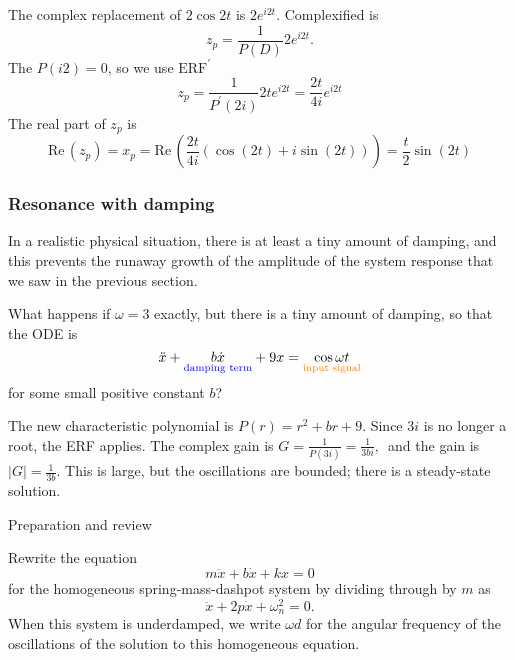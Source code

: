 The complex replacement of $2 \cos 2 t$ is $2 e^{i2t}$.
Complexified is
\begin{equation*}
  z_ p = \frac{1}{P(D)} 2 e^{i2t}. 
\end{equation*}
The $P(i2) = 0$, so we use $\text{ERF}^{\prime}$
\begin{equation*}
  z_ p = \frac{1}{P^{\prime} (2i)} 2t e^{i2t}
  = \frac{2t}{4i}  e^{i2t} 
\end{equation*}
The real part of $z _p$ is
\begin{equation*}
  \mathrm{Re\, } (z _p) = x _p 
  = \mathrm{Re\, } \left(\frac{2t}{4i} \left( \cos (2t) + i \sin (2t)\right) \right)
  = \frac{t}{2} \sin (2t)
\end{equation*}
\clearpage

\subsubsection{Resonance with damping}
In a realistic physical situation, there is at least a tiny amount of damping,
and this prevents the runaway growth of the amplitude of the system response
that we saw in the previous section.\\

\begin{question}
  What happens if $\omega = 3$ exactly, but there is a tiny amount of damping, so that the ODE is
  \begin{equation*}
    \ddot{x} + \underset {{\color{blue}{\text {damping term}}} }{b \dot{x}} + 9 x
    = \underset {{\color{orange}{\text {input signal}}} }{\cos \omega t}
  \end{equation*}
  for some small positive constant $b$?
\end{question}


The new characteristic polynomial is $P(r)=r^2+br+9$.
Since $3i$ is no longer a root, the ERF applies.
The complex gain is $\displaystyle G= \frac{1}{P(3i)} = \frac{1}{3bi},\,$
and the gain is $\displaystyle |G| = \frac{1}{3b}$.
This is large, but the oscillations are bounded; there is a steady-state solution.

\begin{exercise}
  Preparation and review
\end{exercise}
Rewrite the equation
\begin{equation*}
  m\ddot x + b\dot x + kx = 0
\end{equation*}
for the homogeneous spring-mass-dashpot system by dividing through by $m$ as
\begin{equation*}
  \ddot x + 2p\dot x + \omega _ n^2 = 0.
\end{equation*}
When this system is underdamped, we write $\omega d$ for the angular frequency
of the oscillations of the solution to this homogeneous equation. \\

